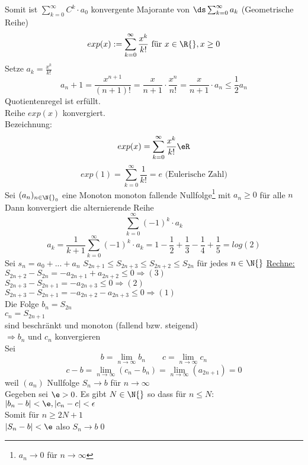 Somit ist $\displaystyle\sum\limits_{k=0}^{\infty} C^k \cdot a_0$ konvergente Majorante von $\ds\sum_{k=0}^{\infty} a_k$ (Geometrische Reihe)
$$exp(x) := \sum\limits_{k=0}^{\infty} \frac{x^k}{k!} \text{ für } x \in \R{}, x \geq 0$$
Setze $a_k = \frac{x^k}{k!}$\\
$$a_n+1 = \frac{x^{n + 1}}{(n + 1)!} = \frac{x}{n+1} \cdot \frac{x^n}{n!} = \frac{x}{n+1} \cdot a_n \leq \frac{1}{2} a_n$$
\Rarr{} Quotientenregel ist erfüllt.\\
Reihe $exp(x)$ konvergiert.\\
Bezeichnung: $$exp(x) = \sum_{k=0}^{\infty} \frac{x^k}{k!} \eR$$
%
$$exp(1) = \sum\limits_{k=0}^{\infty} \frac{1}{k!} = e\text{ (Eulerische Zahl)}$$
Sei $(a_n)_{n \in \N{}_0}$ eine Monoton monoton fallende Nullfolge\footnote{$a_n → 0$ für $n→∞$} mit $a_n \geq 0$ für alle $n$\\
Dann konvergiert die alternierende Reihe\\
$$\sum_{k=0}^{\infty} (-1)^k · a_k$$
\bsp
$$a_k = \frac{1}{k + 1} \sum_{k=0}^{\infty} (-1)^k · a_k = 1 - \frac{1}{2} + \frac{1}{3} - \frac{1}{4} + \frac{1}{5}= log(2)$$
\bew
Sei $s_n = a_0 + ... + a_n$
$S_{2n + 1} \leq S_{2n + 3} \leq S_{2n + 2} \leq S_{2n}$ für jedes $n \in \N{}$
%
\ul{Rechne:}\\
$S_{2n + 2} - S_{2n} = - a_{2n + 1} + a_{2n + 2} \leq 0 \Rightarrow (3)$\\
$S_{2n + 3} - S_{2n + 1} = - a_{2n + 3} \leq 0 \Rightarrow (2)$\\
$S_{2n + 3} - S_{2n + 1} = - a_{2n + 2} - a_{2n + 3} \leq 0 \Rightarrow (1)$\\[8pt]
Die Folge $b_n = S_{2n}$\\
\phantom{Die Folge }$c_n = S_{2n + 1}$\\
sind beschränkt und monoton (fallend bzw. steigend)\\
$\Rightarrow b_n \text{ und } c_n$ konvergieren\\[4pt]
Sei $$b = \lim_{n \to \infty} b_n \qquad c = \lim_{n \to \infty} c_n$$
$$c - b = \lim_{n \to \infty} (c_n - b_n) = \lim_{n \to \infty} (a_{2n + 1}) = 0$$
weil $(a_n)$ Nullfolge
$S_n \to b$ für $n \to \infty$\\[4pt]
Gegeben sei $\e > 0$. Es gibt $N \in \N{}$ so dass für $n \leq N$:\\
$|b_n - b| < \e, |c_n - c| < \epsilon$\\
Somit für $n \geq 2N+1 $\\
$|S_n - b| < \e$ also $S_n \to b$\qed